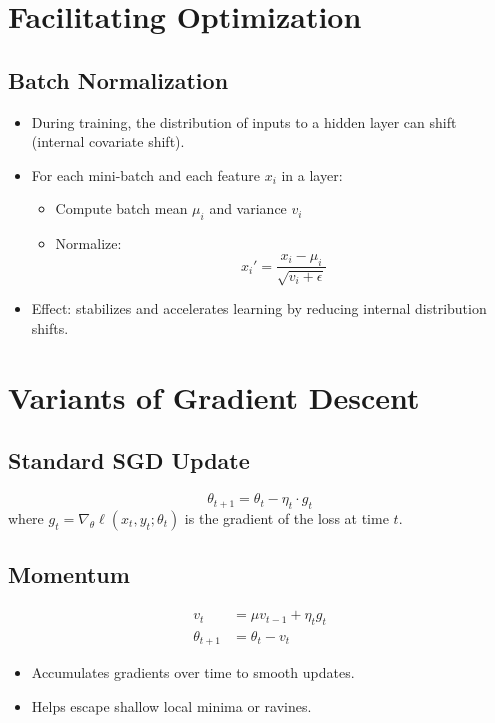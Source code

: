 \documentclass[11pt]{article}
\begin{document}
\section{Facilitating Optimization}

\subsection{Batch Normalization}

\begin{itemize}
    \item During training, the distribution of inputs to a hidden layer can shift (internal covariate shift).
    \item For each mini-batch and each feature $x_i$ in a layer:
    \begin{itemize}
        \item Compute batch mean $\mu_i$ and variance $v_i$
        \item Normalize:
        \[
        x_i' = \frac{x_i - \mu_i}{\sqrt{v_i + \epsilon}}
        \]
    \end{itemize}
    \item Effect: stabilizes and accelerates learning by reducing internal distribution shifts.
\end{itemize}

\section{Variants of Gradient Descent}

\subsection{Standard SGD Update}

\[
\theta_{t+1} = \theta_t - \eta_t \cdot g_t
\]
where $g_t = \nabla_\theta \ell(x_t, y_t; \theta_t)$ is the gradient of the loss at time $t$.

\subsection{Momentum}

\begin{align*}
v_t &= \mu v_{t-1} + \eta_t g_t \\
\theta_{t+1} &= \theta_t - v_t
\end{align*}

\begin{itemize}
    \item Accumulates gradients over time to smooth updates.
    \item Helps escape shallow local minima or ravines.
\end{itemize}
\end{document}
